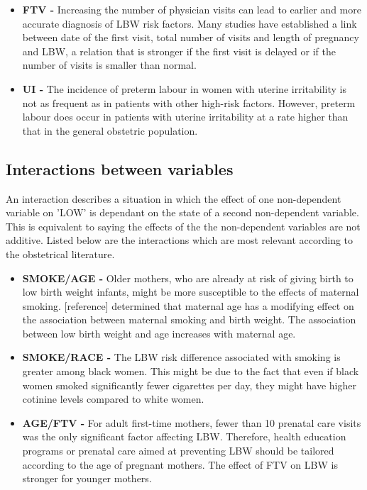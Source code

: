 \begin{itemize}
    \item \textbf{FTV -}
    Increasing the number of physician visits can lead to earlier and more accurate diagnosis of LBW risk factors. Many studies have established a link between date of the first visit, total number of visits and length of pregnancy and LBW, a relation that is stronger if the first visit is delayed or if the number of visits is smaller than normal.\cite{FTV1}\cite{FTV2}\cite{FTV3}
    
    \item \textbf{UI -}
    The incidence of preterm labour in women with uterine irritability is not as frequent as in patients with other high-risk factors. However, preterm labour does occur in patients with uterine irritability at a rate higher than that in the general obstetric population.\cite{UI}
    
    
\end{itemize}

\subsection{Interactions between variables}\label{literatureInterations}
An interaction describes a situation in which the effect of one non-dependent variable on 'LOW' is dependant on the state of a second non-dependent variable. This is equivalent to saying the effects of the the non-dependent variables are not additive. Listed below are the interactions which are most relevant according to the obstetrical literature.

\begin{itemize}
    \item \textbf{SMOKE/AGE -}
    Older mothers, who are already at risk of giving birth to low birth weight infants, might be more susceptible to the effects of maternal smoking. [reference] determined that maternal age has a modifying effect on the association between maternal smoking and birth weight. The association between low birth weight and age increases with maternal age.\cite{SmokeAge}
    
    \item \textbf{SMOKE/RACE -}
    The LBW risk difference associated with smoking is greater among black women. This might be due to the fact that even if black women smoked significantly fewer cigarettes per day, they might have higher cotinine levels compared to white women. \cite{SmokeRace}
    
    \item \textbf{AGE/FTV -}
    For adult first-time mothers, fewer than 10 prenatal care visits was the only significant factor affecting LBW. Therefore, health education programs or prenatal care aimed at preventing LBW should be tailored according to the age of pregnant mothers. The effect of FTV on LBW is stronger for younger mothers.\cite{AgeFTV}
\end{itemize}

